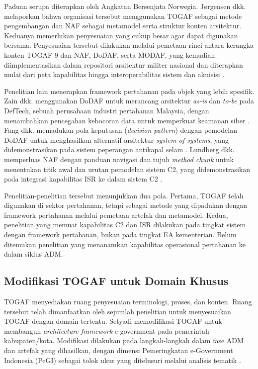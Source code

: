 Paduan serupa diterapkan oleh Angkatan Bersenjata Norwegia. Jørgensen dkk. melaporkan bahwa organisasi tersebut menggunakan TOGAF sebagai metode pengembangan dan NAF sebagai metamodel serta struktur konten arsitektur. Keduanya memerlukan penyesuaian yang cukup besar agar dapat digunakan bersama. Penyesuaian tersebut dilakukan melalui pemetaan rinci antara kerangka konten TOGAF 9 dan NAF, DoDAF, serta MODAF, yang kemudian diimplementasikan dalam repositori arsitektur militer nasional dan diterapkan mulai dari peta kapabilitas hingga interoperabilitas sistem dan akuisisi \cite{Jorgensen2011}.

Penelitian lain menerapkan framework pertahanan pada objek yang lebih spesifik. Zain dkk. menggunakan DoDAF untuk merancang arsitektur \textit{as-is} dan \textit{to-be} pada DefTech, sebuah perusahaan industri pertahanan Malaysia, dengan menambahkan pencegahan kebocoran data untuk memperkuat keamanan siber \cite{Zain2023}. Fang dkk. memadukan pola keputusan (\textit{decision pattern}) dengan pemodelan DoDAF untuk menghasilkan alternatif arsitektur \textit{system of systems}, yang didemonstrasikan pada sistem peperangan antikapal selam \cite{Fang2024}. Lundberg dkk. memperluas NAF dengan panduan navigasi dan tujuh \textit{method chunk} untuk menentukan titik awal dan urutan pemodelan sistem C2, yang didemonstrasikan pada integrasi kapabilitas ISR ke dalam sistem C2 \cite{Lundberg2026}.

Penelitian-penelitian tersebut menunjukkan dua pola. Pertama, TOGAF telah digunakan di sektor pertahanan, tetapi sebagai metode yang dipadukan dengan framework pertahanan melalui pemetaan artefak dan metamodel. Kedua, penelitian yang memuat kapabilitas C2 dan ISR dilakukan pada tingkat sistem dengan framework pertahanan, bukan pada tingkat EA kementerian. Belum ditemukan penelitian yang menanamkan kapabilitas operasional pertahanan ke dalam siklus ADM.

\subsection{Modifikasi TOGAF untuk Domain Khusus}
\label{sec:II.8.2}

TOGAF menyediakan ruang penyesuaian terminologi, proses, dan konten. Ruang tersebut telah dimanfaatkan oleh sejumlah penelitian untuk menyesuaikan TOGAF dengan domain tertentu. Setyadi memodifikasi TOGAF untuk membangun \textit{architecture framework} e-government pada pemerintah kabupaten/kota. Modifikasi dilakukan pada langkah-langkah dalam fase ADM dan artefak yang dihasilkan, dengan dimensi Pemeringkatan e-Government Indonesia (PeGI) sebagai tolok ukur yang ditelusuri melalui analisis tematik \cite{Setyadi2015}.

